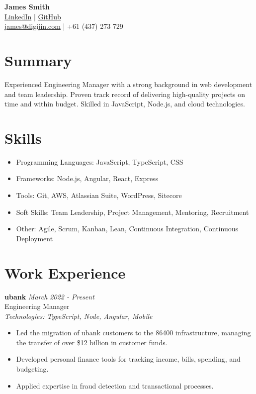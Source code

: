 \documentclass[a4paper,10pt]{article}
\begin{document}
\begin{center}
    {\Huge \textbf{James Smith}} \\
    \href{https://www.linkedin.com/in/digijin/}{LinkedIn} | \href{https://github.com/digijin}{GitHub} \\
    \href{mailto:james@digijin.com}{james@digijin.com} | +61 (437) 273 729
\end{center}

\section*{Summary}
Experienced Engineering Manager with a strong background in web development and team leadership. Proven track record of delivering high-quality projects on time and within budget. Skilled in JavaScript, Node.js, and cloud technologies.

\section*{Skills}
\begin{itemize}
    \item Programming Languages: JavaScript, TypeScript, CSS
    \item Frameworks: Node.js, Angular, React, Express
    \item Tools: Git, AWS, Atlassian Suite, WordPress, Sitecore
    \item Soft Skills: Team Leadership, Project Management, Mentoring, Recruitment
    \item Other: Agile, Scrum, Kanban, Lean, Continuous Integration, Continuous Deployment
\end{itemize}

\section*{Work Experience}

\textbf{ubank} \hfill \textit{March 2022 - Present} \\
Engineering Manager \\
\textit{Technologies: TypeScript, Node, Angular, Mobile}
\begin{itemize}
    \item Led the migration of ubank customers to the 86400 infrastructure, managing the transfer of over \$12 billion in customer funds.
    \item Developed personal finance tools for tracking income, bills, spending, and budgeting.
    \item Applied expertise in fraud detection and transactional processes.
\end{itemize}
\end{document}
